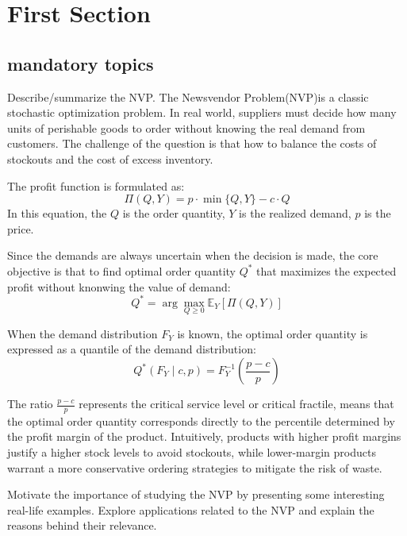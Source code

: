 \section{First Section}\label{s:first_section}
\subsection{mandatory topics}

 Describe/summarize the NVP.
The Newsvendor Problem(NVP)is a classic stochastic optimization problem. In real world, suppliers must decide how many units of perishable goods to order without knowing the real demand from customers. The challenge of the question is that how to balance the costs of stockouts and the cost of excess inventory.

The profit function is formulated as:
\begin{equation*}
\Pi(Q, Y) = p \cdot \min\{Q, Y\} - c \cdot Q
\end{equation*}
In this equation, the $Q$ is the order quantity, $Y$ is the realized demand, $p$ is the price. 

Since the demands are always uncertain when the decision is made, the core objective is that to find optimal order quantity $Q^*$ that maximizes the expected profit without knonwing the value of demand:
\begin{equation*}
Q^* = \arg\max_{Q \geq 0} \mathbb{E}_Y[\Pi(Q, Y)]
\end{equation*}

When the demand distribution $F_Y$ is known, the optimal order quantity is expressed as a quantile of the demand distribution:
 \begin{equation*}
Q^*(F_Y \mid c, p) = F_Y^{-1}\left(\frac{p-c}{p}\right)
\end{equation*}
 
The ratio $\frac{p-c}{p}$ represents the critical service level or critical fractile, means that the optimal order quantity corresponds directly to the percentile determined by the profit margin of the product. Intuitively, products with higher profit margins justify a higher stock levels to avoid stockouts, while lower-margin products warrant a more conservative ordering strategies to mitigate the risk of waste.


 Motivate the importance of studying the NVP by presenting some interesting real-life examples.
Explore applications related to the NVP and explain the reasons behind their relevance.

